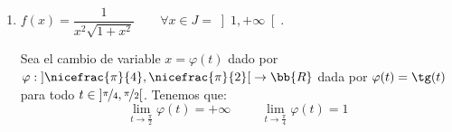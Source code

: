 \begin{ejercicio}
\begin{enumerate}
        Buscamos ahora encontrar un binomio al cuadrado en el denominador para resolver esta última integral. Para ello, completamos cuadrados:
        \begin{align*}
            t^2-t+1&=\left(t-\frac{1}{2}\right)^2+\frac{3}{4}
            = \frac{3}{4}\left[1+\frac{4}{3}\left(t-\frac{1}{2}\right)^2\right]
            = \frac{3}{4}\left[1+\left(\frac{2}{\sqrt{3}}\left(t-\frac{1}{2}\right)\right)^2\right]
        \end{align*}

        Por tanto, tenemos que:
        \begin{align*}
            \int_0^1 \dfrac{1}{t^2-t+1}~dt
            &= \int_0^1 \dfrac{4}{3}\cdot \dfrac{1}{1+\left(\frac{2}{\sqrt{3}}\left(t-\frac{1}{2}\right)\right)^2}~dt
            =\\&= \dfrac{4}{3}\cdot \red{\dfrac{\sqrt{3}}{2}}\cdot \int_0^1 \dfrac{\red{\dfrac{2}{\sqrt{3}}}}{1+\left(\frac{2}{\sqrt{3}}\left(t-\frac{1}{2}\right)\right)^2}~dt
            =\\&= \frac{2\sqrt{3}}{3}\cdot \left[\arctan\left(\frac{2}{\sqrt{3}}\left(t-\frac{1}{2}\right)\right)\right]_0^1
            = \frac{2\sqrt{3}}{9}\cdot \pi
        \end{align*}

        Resolviendo ahora los resultados que hemos obtenido, tenemos que:
        \begin{align*}
            \int_0^1 &\dfrac{1}{x^2 + \sqrt{x}}~dx
            = \frac{2}{3}\cdot \left[\ln(t+1)\right]_0^1
            + \frac{2}{3} \left(-\frac{1}{2}\left[\ln|t^2-t+1|\right]_0^1 + \frac{3}{2}\cdot \frac{2\sqrt{3}}{9}\cdot \pi\right)
            =\\&= \frac{2}{3}\ln 2 + \frac{2}{3}\cdot \frac{3}{2}\cdot \frac{2\sqrt{3}}{9}\cdot \pi
            =\\&= \frac{2}{3}\ln 2 + \frac{2\sqrt{3}}{9}\cdot \pi
        \end{align*}


        \item $f(x)=\dfrac{1}{x^2\sqrt{1+x^2}} \qquad \forall x\in J=\left]1,+\infty\right[$.  
        
        Sea el cambio de variable $x=\varphi(t)$ dado por $\varphi:\left]\nicefrac{\pi}{4},\nicefrac{\pi}{2}\right[\to \bb{R}$ dada por $\varphi(t)=\tg(t)$ para todo $t\in \left]\nicefrac{\pi}{4},\nicefrac{\pi}{2}\right[$.
        Tenemos que:
        \begin{equation*}
            \lim_{t\to \frac{\pi}{2}} \varphi(t) = +\infty \hspace{1cm} \lim_{t\to \frac{\pi}{4}} \varphi(t) = 1
        \end{equation*}


\end{enumerate}
\end{ejercicio}
